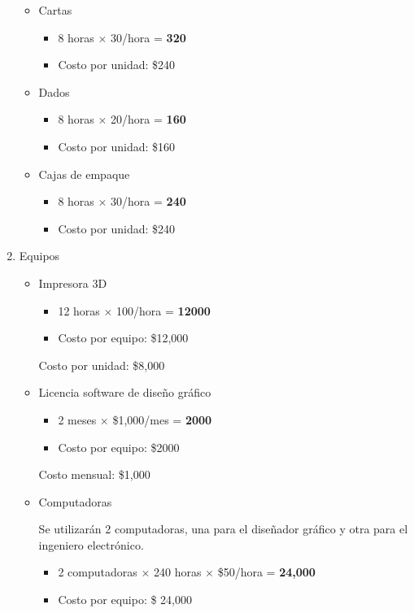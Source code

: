 \documentclass[12pt]{article}
\begin{document}
\begin{enumerate}
\begin{itemize}
		\item Cartas
        \begin{itemize}
            \item 8 horas $\times$ 30/hora = \textbf{320}
            \item Costo por unidad: \$240
        \end{itemize}

		\item Dados
        \begin{itemize}
            \item 8 horas $\times$ 20/hora = \textbf{160}
            \item Costo por unidad: \$160
        \end{itemize}

		\item Cajas de empaque
        \begin{itemize}
            \item 8 horas $\times$ 30/hora = \textbf{240}
            \item Costo por unidad: \$240
        \end{itemize}

	\end{itemize}

	\item Equipos

	\begin{itemize}
		\item Impresora 3D
		\begin{itemize}
            \item 12 horas $\times$ 100/hora = \textbf{12000} 
            \item Costo por equipo: \$12,000
        \end{itemize}

		Costo por unidad: \$8,000

		\item Licencia software de diseño gráfico
		\begin{itemize}
            \item 2 meses $\times$ \$1,000/mes = \textbf{2000}
            \item Costo por equipo: \$2000
        \end{itemize}

		Costo mensual: \$1,000

		\item Computadoras

		Se utilizarán 2 computadoras, una para el diseñador gráfico y otra para el ingeniero electrónico.
		\begin{itemize}
            \item 2 computadoras $\times$ 240 horas $\times$ \$50/hora = \textbf{24,000}
            \item Costo por equipo: \$ 24,000
        \end{itemize}


\end{itemize}
\end{enumerate}
\end{document}
